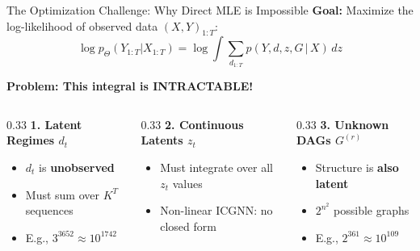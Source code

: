 \documentclass[aspectratio=169]{beamer}
\begin{document}
\begin{frame}{The Optimization Challenge: Why Direct MLE is Impossible}
\textbf{Goal:} Maximize the log-likelihood of observed data $(X, Y)_{1:T}$:
\begin{equation*}
\log p_\Theta(Y_{1:T} | X_{1:T}) = \log \int \sum_{d_{1:T}} p(Y, d, z, G \,|\, X) \, dz
\end{equation*}

\vspace{0.2cm}
\textbf{Problem: This integral is INTRACTABLE!}
\begin{columns}
\begin{column}{0.33\textwidth}
\textbf{1. Latent Regimes $d_t$}
\begin{itemize}
    \scriptsize
    \item $d_t$ is \textbf{unobserved}
    \item Must sum over $K^T$ sequences
    \item E.g., $3^{3652} \approx 10^{1742}$
\end{itemize}
\end{column}

\begin{column}{0.33\textwidth}
\textbf{2. Continuous Latents $z_t$}
\begin{itemize}
    \scriptsize
    \item Must integrate over all $z_t$ values
    \item Non-linear ICGNN: no closed form
\end{itemize}
\end{column}

\begin{column}{0.33\textwidth}
\textbf{3. Unknown DAGs $G^{(r)}$}
\begin{itemize}
    \scriptsize
    \item Structure is \textbf{also latent}
    \item $2^{n^2}$ possible graphs
    \item E.g., $2^{361} \approx 10^{109}$
\end{itemize}
\end{column}
\end{columns}

\vspace{0.3cm}
\begin{center}
\end{center}
\end{frame}
\end{document}

